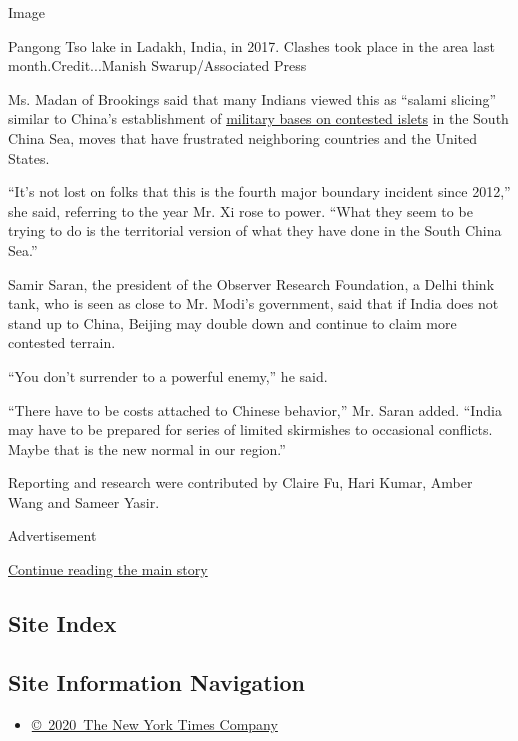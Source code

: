 Image

Pangong Tso lake in Ladakh, India, in 2017. Clashes took place in the
area last month.Credit...Manish Swarup/Associated Press

Ms. Madan of Brookings said that many Indians viewed this as ``salami
slicing'' similar to China's establishment of
\href{https://www.nytimes.com/2018/09/20/world/asia/south-china-sea-navy.html}{military
bases on contested islets} in the South China Sea, moves that have
frustrated neighboring countries and the United States.

``It's not lost on folks that this is the fourth major boundary incident
since 2012,'' she said, referring to the year Mr. Xi rose to power.
``What they seem to be trying to do is the territorial version of what
they have done in the South China Sea.''

Samir Saran, the president of the Observer Research Foundation, a Delhi
think tank, who is seen as close to Mr. Modi's government, said that if
India does not stand up to China, Beijing may double down and continue
to claim more contested terrain.

``You don't surrender to a powerful enemy,'' he said.

``There have to be costs attached to Chinese behavior,'' Mr. Saran
added. ``India may have to be prepared for series of limited skirmishes
to occasional conflicts. Maybe that is the new normal in our region.''

Reporting and research were contributed by Claire Fu, Hari Kumar, Amber
Wang and Sameer Yasir.

Advertisement

\protect\hyperlink{after-bottom}{Continue reading the main story}

\hypertarget{site-index}{%
\subsection{Site Index}\label{site-index}}

\hypertarget{site-information-navigation}{%
\subsection{Site Information
Navigation}\label{site-information-navigation}}

\begin{itemize}
\tightlist
\item
  \href{https://help.nytimes.com/hc/en-us/articles/115014792127-Copyright-notice}{©~2020~The
  New York Times Company}
\end{itemize}

